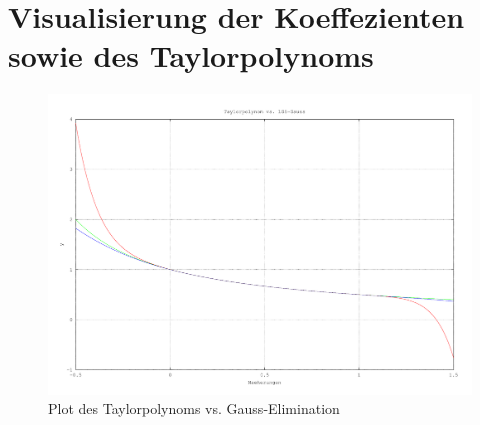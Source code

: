 \chapter{Visualisierung der Koeffezienten sowie des Taylorpolynoms}

\begin{figure}[H]
    \vspace{-1em}
    \begin{center}
        \includegraphics[width=\textwidth]{img/aufgabe5.pdf}
    \end{center}
    \vspace{-1em}
    \caption{Plot des Taylorpolynoms vs. Gauss-Elimination}
    \label{fig:TaylorVsGauss}
\end{figure}